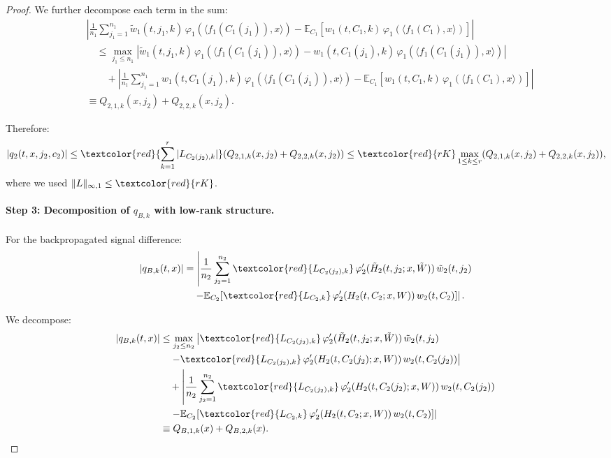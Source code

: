 \begin{proof}
We further decompose each term in the sum:
\begin{align*}
&\left|\frac{1}{n_1}\sum_{j_1=1}^{n_1}\tilde{w}_1(t, j_1, k)\,\varphi_1(\langle f_1(C_1(j_1)), x\rangle) - \mathbb{E}_{C_1}[w_1(t, C_1, k)\,\varphi_1(\langle f_1(C_1), x\rangle)]\right|\\
&\quad \le \max_{j_1 \le n_1}\left|\tilde{w}_1(t, j_1, k)\,\varphi_1(\langle f_1(C_1(j_1)), x\rangle) - w_1(t, C_1(j_1), k)\,\varphi_1(\langle f_1(C_1(j_1)), x\rangle)\right|\\
&\quad\quad + \left|\frac{1}{n_1}\sum_{j_1=1}^{n_1}w_1(t, C_1(j_1), k)\,\varphi_1(\langle f_1(C_1(j_1)), x\rangle) - \mathbb{E}_{C_1}[w_1(t, C_1, k)\,\varphi_1(\langle f_1(C_1), x\rangle)]\right|\\
&\equiv Q_{2,1,k}(x, j_2) + Q_{2,2,k}(x, j_2).
\end{align*}

Therefore:
\[
|q_2(t, x, j_2, c_2)| \le \textcolor{red}{\sum_{k=1}^r |L_{C_2(j_2),k}|}(Q_{2,1,k}(x, j_2) + Q_{2,2,k}(x, j_2)) \le \textcolor{red}{rK}\max_{1 \le k \le r}(Q_{2,1,k}(x, j_2) + Q_{2,2,k}(x, j_2)),
\]
where we used $\|L\|_{\infty,1} \le \textcolor{red}{rK}$.

\paragraph*{Step 3: Decomposition of $q_{B,k}$ with low-rank structure.}

For the backpropagated signal difference:
\begin{align*}
|q_{B,k}(t, x)| &= \left|\frac{1}{n_2}\sum_{j_2=1}^{n_2} \textcolor{red}{L_{C_2(j_2),k}}\,\varphi_2'(\tilde{H}_2(t, j_2; x, \tilde{W}))\,\tilde{w}_2(t, j_2)\right.\\
&\quad\left. - \mathbb{E}_{C_2}[\textcolor{red}{L_{C_2,k}}\,\varphi_2'(H_2(t, C_2; x, W))\,w_2(t, C_2)]\right|.
\end{align*}

We decompose:
\begin{align*}
|q_{B,k}(t, x)| &\le \max_{j_2 \le n_2}\left|\textcolor{red}{L_{C_2(j_2),k}}\,\varphi_2'(\tilde{H}_2(t, j_2; x, \tilde{W}))\,\tilde{w}_2(t, j_2)\right.\\
&\quad\left. - \textcolor{red}{L_{C_2(j_2),k}}\,\varphi_2'(H_2(t, C_2(j_2); x, W))\,w_2(t, C_2(j_2))\right|\\
&\quad + \left|\frac{1}{n_2}\sum_{j_2=1}^{n_2} \textcolor{red}{L_{C_2(j_2),k}}\,\varphi_2'(H_2(t, C_2(j_2); x, W))\,w_2(t, C_2(j_2))\right.\\
&\quad\left. - \mathbb{E}_{C_2}[\textcolor{red}{L_{C_2,k}}\,\varphi_2'(H_2(t, C_2; x, W))\,w_2(t, C_2)]\right|\\
&\equiv Q_{B,1,k}(x) + Q_{B,2,k}(x).
\end{align*}


\end{proof}
